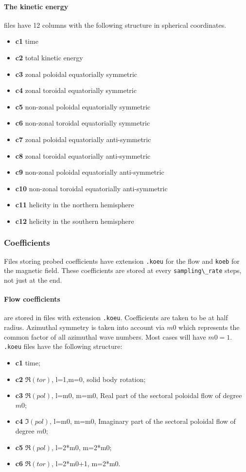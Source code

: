 \documentclass[a4paper,10pt]{book}
\begin{document}
\paragraph{The kinetic energy} files have 12 columns  with the following
structure in spherical coordinates.
\begin{itemize}
 \item{\bf c1} time
 \item{\bf c2} total kinetic energy
 \item{\bf c3} zonal poloidal equatorially symmetric
 \item{\bf c4} zonal toroidal equatorially symmetric
 \item{\bf c5} non-zonal poloidal equatorially symmetric
 \item{\bf c6} non-zonal toroidal equatorially symmetric
 \item{\bf c7} zonal poloidal equatorially anti-symmetric
 \item{\bf c8} zonal toroidal equatorially anti-symmetric
 \item{\bf c9} non-zonal poloidal equatorially anti-symmetric
 \item{\bf c10} non-zonal toroidal equatorially anti-symmetric
 \item{\bf c11} helicity in the northern hemisphere
 \item{\bf c12} helicity in the southern hemisphere
\end{itemize}

\subsubsection{Coefficients}
Files storing probed coefficients have extension \verb|.koeu| for the flow and
\verb|koeb| for the magnetic field. These coefficients are stored at every
\verb|sampling\_rate| steps, not just at the end.

\paragraph{Flow coefficients} are stored in files with extension \verb|.koeu|.
Coefficients are taken to be at half radius. Azimuthal symmetry is taken into
account via $m0$ which represents the common factor of all azimuthal wave
numbers. Most cases will have $m0=1$.
\verb|.koeu| files have the following structure:
\begin{itemize}
 \item{\bf c1} time;
 \item{\bf c2} $\Re(tor)$, l=1,m=0, solid body rotation;
 \item{\bf c3} $\Re(pol)$, l=m0, m=m0, Real part of the sectoral poloidal flow
of degree $m0$;
 \item{\bf c4} $\Im(pol)$, l=m0, m=m0, Imaginary part of the sectoral poloidal
flow of degree $m0$;
 \item{\bf c5} $\Re(pol)$, l=2*m0, m=2*m0;
 \item{\bf c6} $\Re(tor)$, l=2*m0+1, m=2*m0.
\end{itemize}
\end{document}

